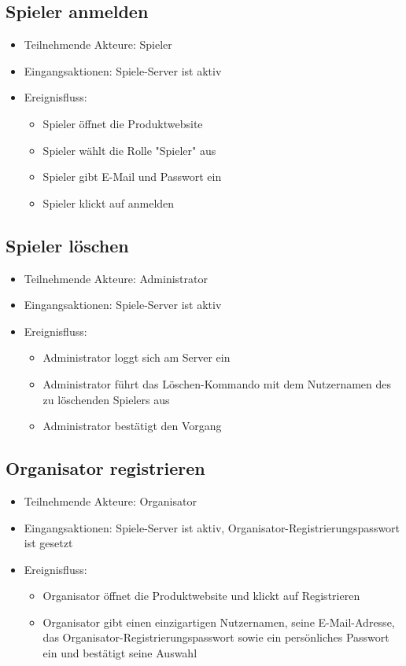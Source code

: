 \documentclass[a4paper]{scrreprt}
\begin{document}
    \subsection{Spieler anmelden}
    \begin{itemize}
        \item Teilnehmende Akteure: \Gls{Spieler}
        \item Eingangsaktionen: Spiele-Server ist aktiv
        \item Ereignisfluss:
        \begin{itemize}
            \item Spieler öffnet die Produktwebsite
            \item Spieler wählt die Rolle "Spieler" aus
            \item Spieler gibt E-Mail und Passwort ein
            \item Spieler klickt auf anmelden
        \end{itemize}
    \end{itemize}

    \subsection{Spieler löschen}
    \begin{itemize}
        \item Teilnehmende Akteure: \Gls{Administrator}
        \item Eingangsaktionen: Spiele-Server ist aktiv
        \item Ereignisfluss:
        \begin{itemize}
            \item Administrator loggt sich am Server ein
            \item Administrator führt das Löschen-Kommando mit dem Nutzernamen des zu löschenden Spielers aus
            \item Administrator bestätigt den Vorgang
        \end{itemize}
    \end{itemize}

    \subsection{Organisator registrieren}
    \begin{itemize}
        \item Teilnehmende Akteure: \Gls{Organisator}
        \item Eingangsaktionen: Spiele-Server ist aktiv, Organisator-Registrierungspasswort ist gesetzt
        \item Ereignisfluss:
        \begin{itemize}
            \item Organisator öffnet die Produktwebsite und klickt auf Registrieren
            \item Organisator gibt einen einzigartigen Nutzernamen, seine E-Mail-Adresse, das Organisator-Registrierungspasswort sowie ein persönliches Passwort ein und bestätigt seine Auswahl
        \end{itemize}
    \end{itemize}
\end{document}
